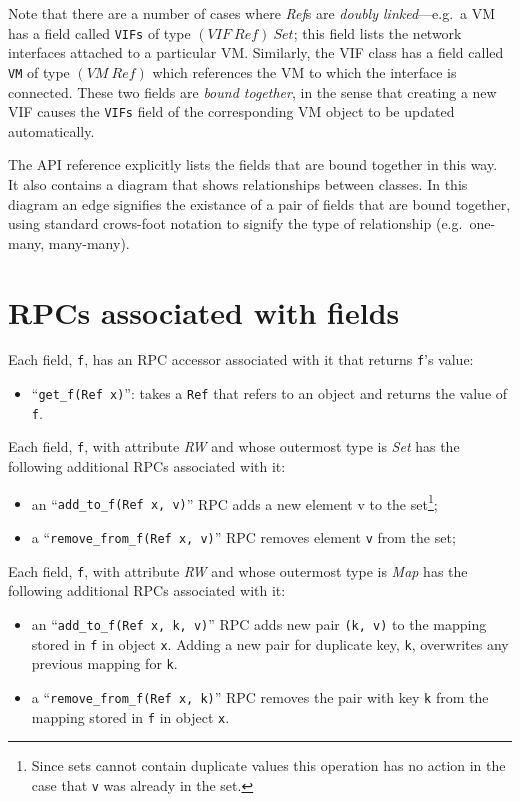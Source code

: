 Note that there are a number of cases where {\em Ref}s are {\em doubly
linked\/}---e.g.\ a VM has a field called {\tt VIFs} of type
$(\mathit{VIF}~\mathit{Ref})~\mathit{Set}$; this field lists
the network interfaces attached to a particular VM. Similarly, the VIF
class has a field called {\tt VM} of type $(\mathit{VM}~{\mathit
Ref})$ which references the VM to which the interface is connected.
These two fields are {\em bound together\/}, in the sense that
creating a new VIF causes the {\tt VIFs} field of the corresponding
VM object to be updated automatically.

The API reference explicitly lists the fields that are
bound together in this way. It also contains a diagram that shows
relationships between classes. In this diagram an edge signifies the
existance of a pair of fields that are bound together, using standard
crows-foot notation to signify the type of relationship (e.g.\
one-many, many-many).

\section{RPCs associated with fields}

Each field, {\tt f}, has an RPC accessor associated with it
that returns {\tt f}'s value:
\begin{itemize}
\item ``{\tt get\_f(Ref x)}'': takes a
{\tt Ref} that refers to an object and returns the value of {\tt f}.
\end{itemize}

Each field, {\tt f}, with attribute
{\em RW} and whose outermost type is {\em Set\/} has the following
additional RPCs associated with it:
\begin{itemize}
\item an ``{\tt add\_to\_f(Ref x, v)}'' RPC adds a new element v to the set\footnote{
%
Since sets cannot contain duplicate values this operation has no action in the case
that {\tt v} was already in the set.
%
};
\item a ``{\tt remove\_from\_f(Ref x, v)}'' RPC removes element {\tt v} from the set;
\end{itemize}

Each field, {\tt f}, with attribute
{\em RW} and whose outermost type is {\em Map\/} has the following
additional RPCs associated with it:
\begin{itemize}
\item an ``{\tt add\_to\_f(Ref x, k, v)}'' RPC adds new pair {\tt (k, v)}
to the mapping stored in {\tt f} in object {\tt x}. Adding a new pair for duplicate
key, {\tt k}, overwrites any previous mapping for {\tt k}.
\item a ``{\tt remove\_from\_f(Ref x, k)}'' RPC removes the pair with key {\tt k}
from the mapping stored in {\tt f} in object {\tt x}.
\end{itemize}

